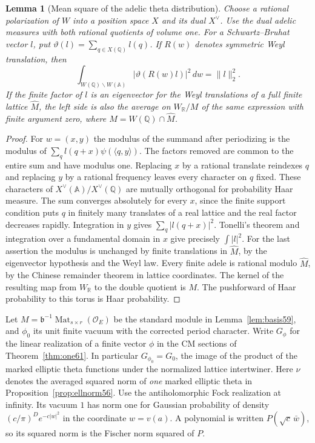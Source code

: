 \documentclass[a4paper,11pt]{article}
\newtheorem{lemma}[proposition]{Lemma}
\theoremstyle{definition}
\theoremstyle{remark}
\newcommand{\RR}{\mathbb R}\newcommand{\CC}{\mathbb C}\newcommand{\QQ}{\mathbb Q}
\numberwithin{equation}{section}
\newcommand{\OO}{\mathcal O}
\begin{document}
\begin{lemma}[Mean square of the adelic theta distribution]
\label{lem:zak242}
Choose a rational polarization of \(W\) into a position space \(X\)
and its dual \(X^\vee\). Use the dual adelic measures with both
rational quotients of volume one. For a Schwartz--Bruhat vector
\(l\), put \(\vartheta(l)=\sum_{q\in X(\QQ)}l(q)\).
If \(R(w)\) denotes symmetric Weyl translation, then
\[
 \int_{W(\QQ)\backslash W(\mathbb A)}
                  |\vartheta(R(w)l)|^2\,dw=\|l\|_2^2 .
\]
If the finite factor of \(l\) is an eigenvector for the Weyl
translations of a full finite lattice \(\widehat M\), the left
side is also the average on \(W_{\RR}/M\) of the same expression
with finite argument zero, where \(M=W(\QQ)\cap\widehat M\).
\end{lemma}
\begin{proof}
For \(w=(x,y)\) the modulus of the summand after periodizing is
the modulus of
\(\sum_q l(q+x)\psi(\langle q,y\rangle)\). The factors removed
are common to the entire sum and have modulus one. Replacing \(x\)
by a rational translate reindexes \(q\) and replacing \(y\) by a
rational frequency leaves every character on \(q\) fixed. These
characters of \(X^\vee(\mathbb A)/X^\vee(\QQ)\) are mutually
orthogonal for probability Haar measure. The sum converges
absolutely for every \(x\), since the finite support condition
puts \(q\) in finitely many translates of a real lattice and
the real factor decreases rapidly. Integration in \(y\) gives
\(\sum_q |l(q+x)|^2\). Tonelli's theorem and integration over a
fundamental domain in \(x\) give precisely \(\int |l|^2\).
For the last assertion the modulus is unchanged by finite
translations in \(\widehat M\), by the eigenvector hypothesis and
the Weyl law. Every finite adele is rational modulo \(\widehat M\),
by the Chinese remainder theorem in lattice coordinates. The
kernel of the resulting map from \(W_{\RR}\) to the double
quotient is \(M\). The pushforward of Haar probability to this
torus is Haar probability.
\end{proof}

Let \(M=\mathfrak b^{-1}\operatorname{Mat}_{s\times r}(\OO_E)\)
be the standard module in Lemma~\ref{lem:basis59}, and
\(\phi_0\) its unit finite vacuum with the corrected period character.
Write \(G_\phi\) for the linear realization of a finite vector
\(\phi\) in the CM sections of Theorem~\ref{thm:one61}. In
particular \(G_{\phi_0}=G_0\), the image of the product of the
marked elliptic theta functions under the normalized lattice
intertwiner. Here \(\nu\) denotes the averaged squared norm of
\emph{one} marked elliptic theta in Proposition~\ref{prop:ellnorm56}.
Use the antiholomorphic Fock realization at infinity. Its vacuum
\(1\) has norm one for Gaussian probability of density
\((c/\pi)^D e^{-c|w|^2}\) in the coordinate \(w=v(a)\).
A polynomial is written \(P(\sqrt c\,\bar w)\), so its squared
norm is the Fischer norm squared of \(P\).
\end{document}
